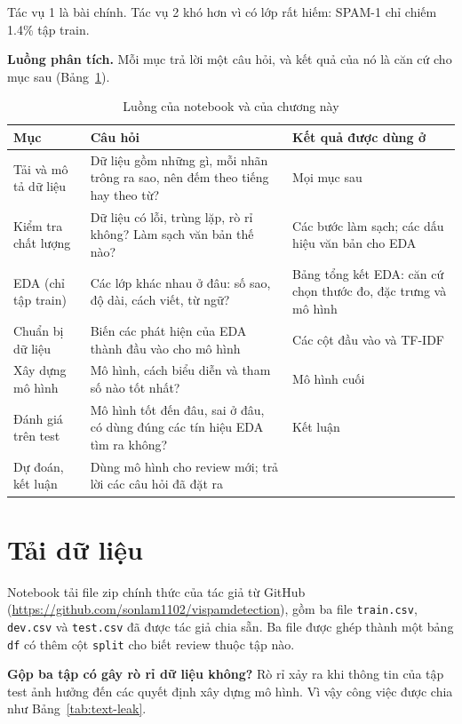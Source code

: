 Tác vụ 1 là bài chính. Tác vụ 2 khó hơn vì có lớp rất hiếm: SPAM-1 chỉ chiếm 1.4\% tập train.

\textbf{Luồng phân tích.} Mỗi mục trả lời một câu hỏi, và kết quả của nó là căn cứ cho mục sau (Bảng~\ref{tab:text-flow}).

\begin{table}[H]
\centering
\caption{Luồng của notebook và của chương này}
\label{tab:text-flow}
\begin{tabular}{>{\raggedright\arraybackslash}p{3.6cm}>{\raggedright\arraybackslash}p{6.0cm}>{\raggedright\arraybackslash}p{4.8cm}}
\toprule
Mục & Câu hỏi & Kết quả được dùng ở\\
\midrule
Tải và mô tả dữ liệu & Dữ liệu gồm những gì, mỗi nhãn trông ra sao, nên đếm theo tiếng hay theo từ? & Mọi mục sau\\
Kiểm tra chất lượng & Dữ liệu có lỗi, trùng lặp, rò rỉ không? Làm sạch văn bản thế nào? & Các bước làm sạch; các dấu hiệu văn bản cho EDA\\
EDA (chỉ tập train) & Các lớp khác nhau ở đâu: số sao, độ dài, cách viết, từ ngữ? & Bảng tổng kết EDA: căn cứ chọn thước đo, đặc trưng và mô hình\\
Chuẩn bị dữ liệu & Biến các phát hiện của EDA thành đầu vào cho mô hình & Các cột đầu vào và TF-IDF\\
Xây dựng mô hình & Mô hình, cách biểu diễn và tham số nào tốt nhất? & Mô hình cuối\\
Đánh giá trên test & Mô hình tốt đến đâu, sai ở đâu, có dùng đúng các tín hiệu EDA tìm ra không? & Kết luận\\
Dự đoán, kết luận & Dùng mô hình cho review mới; trả lời các câu hỏi đã đặt ra & \\
\bottomrule
\end{tabular}
\end{table}

\section{Tải dữ liệu}
\label{sec:text-load}

Notebook tải file zip chính thức của tác giả từ GitHub (\url{https://github.com/sonlam1102/vispamdetection}), gồm ba file
\texttt{train.csv}, \texttt{dev.csv} và \texttt{test.csv} đã được tác giả chia sẵn. Ba file được ghép thành một bảng \texttt{df}
có thêm cột \texttt{split} cho biết review thuộc tập nào.

\textbf{Gộp ba tập có gây rò rỉ dữ liệu không?} Rò rỉ xảy ra khi thông tin của tập test ảnh hưởng đến các quyết định
xây dựng mô hình. Vì vậy công việc được chia như Bảng~\ref{tab:text-leak}.

